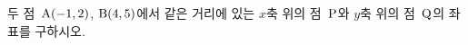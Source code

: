 두 점~$\mathrm{A}(-1{,}\mkern3mu\mathopen{}2)$, $\mathrm{B}(4{,}\mkern3mu\mathopen{}5)$에서 같은 거리에 있는 $x$축 위의 점~$\mathrm{P}$와 $y$축 위의 점~$\mathrm{Q}$의 좌표를 구하시오.
